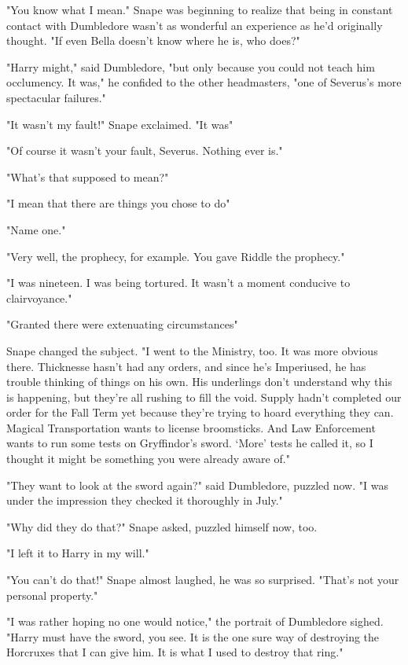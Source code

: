 "You know what I mean." Snape was beginning to realize that being in constant contact with Dumbledore wasn't as wonderful an experience as he'd originally thought. "If even Bella doesn't know where he is, who does?"

"Harry might," said Dumbledore, "but only because you could not teach him occlumency. It was," he confided to the other headmasters, "one of Severus's more spectacular failures."

"It wasn't my fault!" Snape exclaimed. "It was{\el}"

"Of course it wasn't your fault, Severus. Nothing ever is."

"What's that supposed to mean?"

"I mean that there are things you chose to do{\el}"

"Name one."

"Very well, the prophecy, for example. You gave Riddle the prophecy."

"I was nineteen. I was being tortured. It wasn't a moment conducive to clairvoyance."

"Granted there were extenuating circumstances{\el}"

Snape changed the subject. "I went to the Ministry, too. It was more obvious there. Thicknesse hasn't had any orders, and since he's Imperiused, he has trouble thinking of things on his own. His underlings don't understand why this is happening, but they're all rushing to fill the void. Supply hadn't completed our order for the Fall Term yet because they're trying to hoard everything they can. Magical Transportation wants to license broomsticks. And Law Enforcement wants to run some tests on Gryffindor's sword. `More' tests he called it, so I thought it might be something you were already aware of."

"They want to look at the sword again?" said Dumbledore, puzzled now. "I was under the impression they checked it thoroughly in July."

"Why did they do that?" Snape asked, puzzled himself now, too.

"I left it to Harry in my will."

"You can't do that!" Snape almost laughed, he was so surprised. "That's not your personal property."

"I was rather hoping no one would notice," the portrait of Dumbledore sighed. "Harry must have the sword, you see. It is the one sure way of destroying the Horcruxes that I can give him. It is what I used to destroy that ring."

